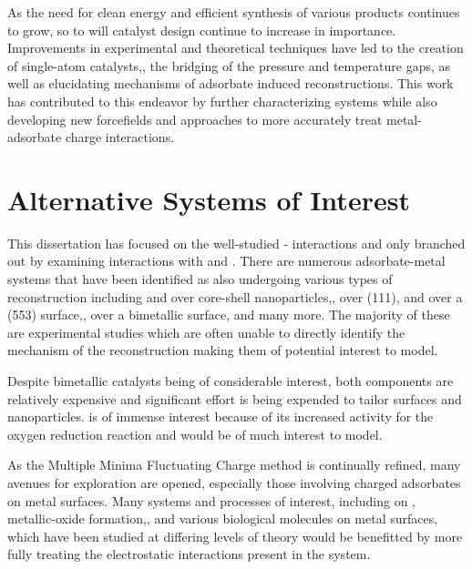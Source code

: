 As the need for clean energy and efficient synthesis of various products
continues to grow, so to will catalyst design continue to increase in
importance.  Improvements in experimental and theoretical techniques have led
to the creation of single-atom catalysts,\citep{Qiao:2011zp, Yang:2013sf}, the bridging of the pressure
and temperature gaps,\citep{Tao:2010aa, Eren:2016qt} as well as elucidating mechanisms of adsorbate
induced reconstructions.\citep{Michalka:2013aa,Kim:2016cr} This work has contributed to this endeavor by
further characterizing  systems while also developing new
forcefields and approaches to more accurately treat metal-adsorbate charge
interactions.



\section{Alternative Systems of Interest}
This dissertation has focused on the well-studied - interactions
and only branched out by examining  interactions with  and
.  There are numerous adsorbate-metal systems that have been identified
as also undergoing various types of reconstruction including  and
 over  core-shell nanoparticles,\citep{Tao:2008aa},
 over  (111),\citep{Eren:2016qt}  and  over a (553)
 surface,\citep{Zhang:2015zr},  over a  bimetallic
surface,\citep{Kim:2013mi} and many more. The majority of these are experimental
studies which are often unable to directly identify the mechanism of the
reconstruction making them of potential interest to model.

Despite  bimetallic catalysts being of considerable interest,
both components are relatively expensive and significant effort is being
expended to tailor  surfaces and nanoparticles.
 is of immense interest because of its increased activity for
the oxygen reduction reaction and would be of much interest to
model.\citep{Tuaev:2013fk, Stamenkovic:2007kk,Sneed:2014fj}

As the Multiple Minima Fluctuating Charge method is continually refined, many
avenues for exploration are opened, especially those involving charged
adsorbates on metal surfaces. Many systems and processes of interest, including
 on ,\citep{Xu:0dz} metallic-oxide
formation,\citep{Streitz:1994mw, Fantauzzi:2014pb, Lloyd:2016jt}, and various
biological molecules on metal surfaces,\citep{Padmos:0qf, Mete:2015rc} which
have been studied at differing levels of theory would be benefitted by more
fully treating the electrostatic interactions present in the system. 
